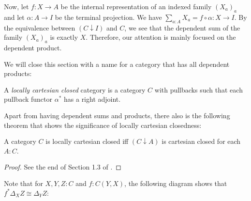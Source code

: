 Now, let $ f : X \to A $ be the internal representation of an indexed family $ (X_a)_a $ and let $ \alpha : A \to I $ be the terminal projection. We have $ \sum_{a : A} X_a = f \circ \alpha : X \to I $. By the equivalence between $ (C \downarrow I) $ and $ C $, we see that the dependent sum of the family $ (X_a)_a $ is exactly $ X $. Therefore, our attention is mainly focused on the dependent product.

We will close this section with a name for a category that has all dependent products:

\begin{definition}
  A \textit{locally cartesian closed} category is a category $ C $ with pullbacks such that each pullback functor $ \alpha^* $ has a right adjoint.
\end{definition}

Apart from having dependent sums and products, there also is the following theorem that shows the significance of locally cartesian closedness:
\begin{lemma}\label{lem:locally-cartesian-closed}
  A category $ C $ is locally cartesian closed iff $ (C \downarrow A) $ is cartesian closed for each $ A : C $.
\end{lemma}
\begin{proof}
  See the end of Section 1.3 of \autocite{freyd}.
\end{proof}

\begin{remark}\label{rem:pullback-of-projection}
  Note that for $ X, Y, Z : C $ and $ f: C(Y, X) $, the following diagram shows that $ f^* \Delta_X Z \cong \Delta_Y Z $:
  \begin{center}
  \end{center}
\end{remark}

